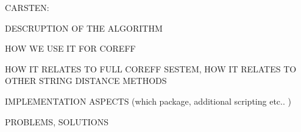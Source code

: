 
CARSTEN:

DESCRUPTION OF THE ALGORITHM

HOW WE USE IT FOR COREFF

HOW IT RELATES TO FULL COREFF SESTEM, HOW IT RELATES TO OTHER STRING DISTANCE METHODS

IMPLEMENTATION ASPECTS (which package, additional scripting etc.. )

PROBLEMS, SOLUTIONS



